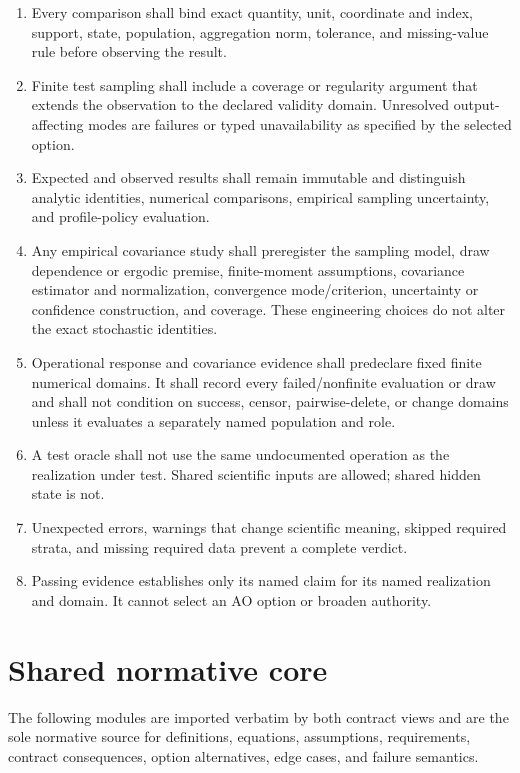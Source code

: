 \documentclass[10pt]{article}
\begin{document}
\begin{enumerate}
  \item Every comparison shall bind exact quantity, unit, coordinate and index,
  support, state, population, aggregation norm, tolerance, and missing-value
  rule before observing the result.
  \item Finite test sampling shall include a coverage or regularity argument
  that extends the observation to the declared validity domain. Unresolved
  output-affecting modes are failures or typed unavailability as specified by
  the selected option.
  \item Expected and observed results shall remain immutable and distinguish
  analytic identities, numerical comparisons, empirical sampling uncertainty,
  and profile-policy evaluation.
  \item Any empirical covariance study shall preregister the sampling model,
  draw dependence or ergodic premise, finite-moment assumptions, covariance
  estimator and normalization, convergence mode/criterion, uncertainty or
  confidence construction, and coverage. These engineering choices do not
  alter the exact stochastic identities.
  \item Operational response and covariance evidence shall predeclare fixed
  finite numerical domains. It shall record every failed/nonfinite evaluation
  or draw and shall not condition on success, censor, pairwise-delete, or
  change domains unless it evaluates a separately named population and role.
  \item A test oracle shall not use the same undocumented operation as the
  realization under test. Shared scientific inputs are allowed; shared hidden
  state is not.
  \item Unexpected errors, warnings that change scientific meaning, skipped
  required strata, and missing required data prevent a complete verdict.
  \item Passing evidence establishes only its named claim for its named
  realization and domain. It cannot select an AO option or broaden authority.
\end{enumerate}

\part{Shared normative core}

The following modules are imported verbatim by both contract views and are the
sole normative source for definitions, equations, assumptions, requirements,
contract consequences, option alternatives, edge cases, and failure semantics.
\end{document}
